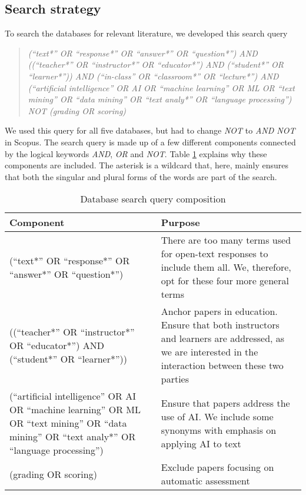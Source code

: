 \subsection{Search strategy}
To search the databases for relevant literature, we developed this search query

\begin{quote}
    \textit{(``text*'' OR ``response*'' OR ``answer*'' OR ``question*'') AND ((``teacher*'' OR ``instructor*'' OR ``educator*'') AND (``student*'' OR ``learner*'')) AND (``in-class'' OR ``classroom*'' OR ``lecture*'') AND (``artificial intelligence'' OR AI OR ``machine learning'' OR ML OR ``text mining'' OR ``data mining'' OR ``text analy*'' OR ``language processing'') NOT (grading OR scoring)}
\end{quote}

We used this query for all five databases, but had to change \textit{NOT} to \textit{AND NOT} in Scopus. The search query is made up of a few different components connected by the logical keywords \textit{AND}, \textit{OR} and \textit{NOT}. Table \ref{tab:searchquery} explains why these components are included. The asterisk is a wildcard that, here, mainly ensures that both the singular and plural forms of the words are part of the search.

\begin{table}[h!]
\centering
\caption{Database search query composition}
\label{tab:searchquery}
\begin{tabularx}{\textwidth}{|X|X|}
\hline
\textbf{Component} & \textbf{Purpose} \\
\hline
(``text*'' OR ``response*'' OR ``answer*'' OR ``question*'') & There are too many terms used for open-text responses to include them all. We, therefore, opt for these four more general terms \\
\hline
((``teacher*'' OR ``instructor*'' OR ``educator*'') AND (``student*'' OR ``learner*'')) & Anchor papers in education. Ensure that both instructors and learners are addressed, as we are interested in the interaction between these two parties \\
\hline
(``artificial intelligence'' OR AI OR ``machine learning'' OR ML OR ``text mining'' OR ``data mining'' OR ``text analy*'' OR ``language processing'') & Ensure that papers address the use of AI. We include some synonyms with emphasis on applying AI to text \\
\hline
(grading OR scoring) & Exclude papers focusing on automatic assessment \\
\hline
\end{tabularx}
\end{table}

